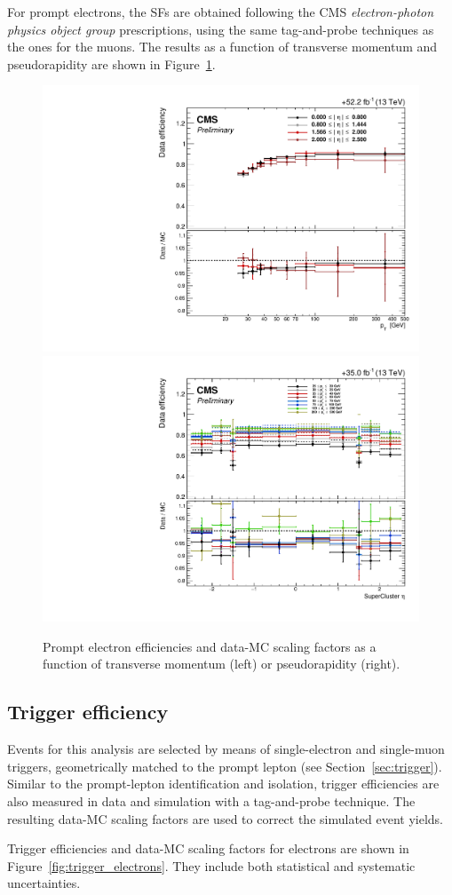 For prompt electrons, the SFs are obtained following the CMS \emph{electron-photon physics object group} prescriptions, using the same
tag-and-probe techniques as the ones for the muons. The results as a function of transverse momentum and pseudorapidity are shown in Figure~\ref{fig:id_sf_electrons}.
\begin{figure}[h]
  \centering
   \includegraphics[width=.38\textwidth]{Figures/c6/efficiencies/ID_electrons/2018/leptonSF_SFvspT_HNLprompt.pdf}
\hspace{1cm}
  \includegraphics[width=.38\textwidth]{Figures/c6/efficiencies/ID_electrons/2016/leptonSF_SFvseta_HNLprompt.pdf}
  \caption{Prompt electron efficiencies and data-MC scaling factors as
    a function of transverse momentum (left) or pseudorapidity
    (right). }
  \label{fig:id_sf_electrons}
\end{figure}

\subsection{Trigger efficiency} \label{sec:triggereff}
Events for this analysis are selected by means of single-electron and
single-muon triggers, geometrically matched to the prompt lepton \lone
(see Section~\ref{sec:trigger}).
Similar to the prompt-lepton identification and isolation,
trigger efficiencies are also measured in data and simulation with a
tag-and-probe technique. The resulting data-MC scaling factors are used to correct the
simulated event yields. 

Trigger efficiencies and data-MC scaling
factors for electrons are shown in Figure~\ref{fig:trigger_electrons}.
They include both statistical and systematic uncertainties.

